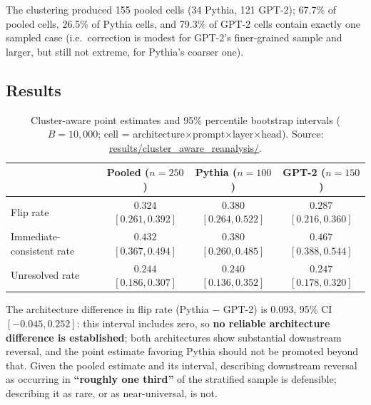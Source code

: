 \documentclass[11pt]{article}
\begin{document}
The clustering produced 155 pooled cells (34 Pythia, 121 GPT-2); 67.7\% of
pooled cells, 26.5\% of Pythia cells, and 79.3\% of GPT-2 cells contain
exactly one sampled case (i.e.\ correction is modest for GPT-2's
finer-grained sample and larger, but still not extreme, for Pythia's
coarser one).

\subsection{Results}

\begin{table}[h]
\centering
\begin{tabular}{lccc}
\toprule
 & Pooled ($n=250$) & Pythia ($n=100$) & GPT-2 ($n=150$) \\
\midrule
Flip rate & $0.324$ \; $[0.261,0.392]$ & $0.380$ \; $[0.264,0.522]$ & $0.287$ \; $[0.216,0.360]$ \\
Immediate-consistent rate & $0.432$ \; $[0.367,0.494]$ & $0.380$ \; $[0.260,0.485]$ & $0.467$ \; $[0.388,0.544]$ \\
Unresolved rate & $0.244$ \; $[0.186,0.307]$ & $0.240$ \; $[0.136,0.352]$ & $0.247$ \; $[0.178,0.320]$ \\
\bottomrule
\end{tabular}
\caption{Cluster-aware point estimates and 95\% percentile bootstrap
intervals ($B=10{,}000$; cell = architecture$\times$prompt$\times$layer$\times$head).
Source: \url{results/cluster_aware_reanalysis/}.}
\label{tab:dph}
\end{table}

The architecture difference in flip rate (Pythia $-$ GPT-2) is $0.093$, 95\%
CI $[-0.045, 0.252]$: this interval includes zero, so \textbf{no reliable
architecture difference is established}; both architectures show substantial
downstream reversal, and the point estimate favoring Pythia should not be
promoted beyond that. Given the pooled estimate and its interval, describing
downstream reversal as occurring in \textbf{``roughly one third''} of the
stratified sample is defensible; describing it as rare, or as near-universal,
is not.
\end{document}
